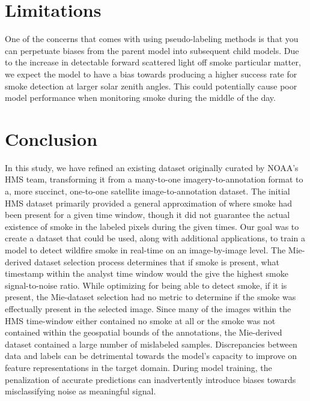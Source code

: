 \documentclass{article}
\begin{document}
\section{Limitations}

One of the concerns that comes with using pseudo-labeling methods is that you can perpetuate biases from the parent model into subsequent child models. Due to the increase in detectable forward scattered light off smoke particular matter, we expect the model to have a bias towards producing a higher success rate for smoke detection at larger solar zenith angles. This could potentially cause poor model performance when monitoring smoke during the middle of the day.

\section{Conclusion}

In this study, we have refined an existing dataset originally curated by NOAA's HMS team, transforming it from a many-to-one imagery-to-annotation format to a, more succinct, one-to-one satellite image-to-annotation dataset. The initial HMS dataset primarily provided a general approximation of where smoke had been present for a given time window, though it did not guarantee the actual existence of smoke in the labeled pixels during the given times. Our goal was to create a dataset that could be used, along with additional applications, to train a model to detect wildfire smoke in real-time on an image-by-image level. The Mie-derived dataset selection process determines that if smoke is present, what timestamp within the analyst time window would the give the highest smoke signal-to-noise ratio. While optimizing for being able to detect smoke, if it is present, the Mie-dataset selection had no metric to determine if the smoke was effectually present in the selected image. Since many of the images within the HMS time-window either contained no smoke at all or the smoke was not contained within the geospatial bounds of the annotations, the Mie-derived dataset contained a large number of mislabeled samples. Discrepancies between data and labels can be detrimental towards the model's capacity to improve on feature representations in the target domain. During model training, the penalization of accurate predictions can inadvertently introduce biases towards misclassifying noise as meaningful signal. 
\end{document}
